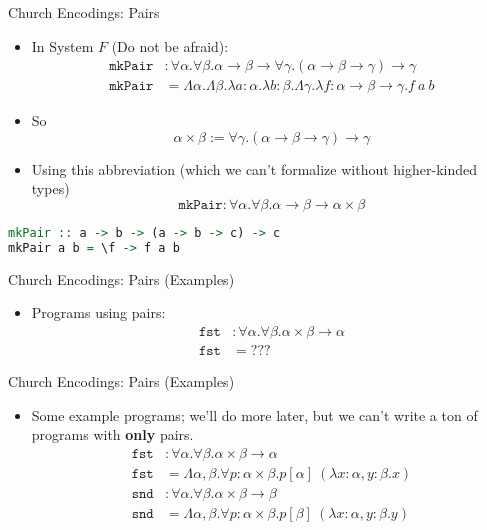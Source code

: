 \documentclass[leqno,presentation,usenames,dvipsnames]{beamer}
\begin{document}
\begin{frame}[fragile]{Church Encodings: Pairs}
    \begin{itemize}
        \item In System $F$ (Do not be afraid):
\begin{align*}
    \texttt{mkPair} &: \forall \alpha. \forall \beta. \alpha \to \beta \to \forall \gamma. (\alpha \to \beta \to \gamma) \to \gamma \\
    \texttt{mkPair} &= \Lambda \alpha. \Lambda \beta. \lambda a : \alpha. \lambda b : \beta. \Lambda \gamma. \lambda f : \alpha \to \beta \to \gamma. f~a~b
\end{align*}
        \item So
\[
    \alpha \times \beta := \forall \gamma. (\alpha \to \beta \to \gamma) \to \gamma
\]
        \item Using this abbreviation (which we can't formalize without higher-kinded types)
\[
    \texttt{mkPair} : \forall \alpha. \forall \beta. \alpha \to \beta \to \alpha \times \beta
\]
    \end{itemize}
\begin{lstlisting}[language=haskell, basicstyle=\small\ttfamily]
mkPair :: a -> b -> (a -> b -> c) -> c
mkPair a b = \f -> f a b
\end{lstlisting}
\end{frame}

\begin{frame}[fragile]{Church Encodings: Pairs (Examples)}
    \begin{itemize}
        \item Programs using pairs:
\begin{align*}
    \texttt{fst} & : \forall \alpha. \forall \beta. \alpha \times \beta \to \alpha \\
    \texttt{fst} & = ???
\end{align*}
    \end{itemize}
\end{frame}

\begin{frame}[fragile]{Church Encodings: Pairs (Examples)}
    \begin{itemize}
        \item Some example programs; we'll do more later, but we can't write a ton of programs with \textbf{only} pairs.
\begin{align*}
    \texttt{fst} & : \forall \alpha. \forall \beta. \alpha \times \beta \to \alpha \\
    \texttt{fst} & = \Lambda \alpha, \beta. \forall p : \alpha \times \beta. p[\alpha]~(\lambda x : \alpha, y : \beta. x) \\
    \texttt{snd} & : \forall \alpha. \forall \beta. \alpha \times \beta \to \beta \\
    \texttt{snd} & = \Lambda \alpha, \beta. \forall p : \alpha \times \beta. p[\beta]~(\lambda x : \alpha, y : \beta. y)
\end{align*}
    \end{itemize}
\end{frame}
\end{document}
